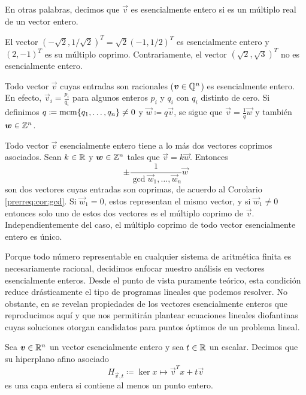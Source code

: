 \noindent
En otras palabras, decimos que $\vec{v}$ es esencialmente entero si es un múltiplo real de un vector
entero.
\begin{example}
	El vector $\left(-\sqrt{2}, 1/\sqrt{2}\right)^T = \sqrt{2}(-1, 1/2)^T$ es esencialmente entero
	y $(2, -1)^T$ es su múltiplo coprimo. Contrariamente, el vector $(\sqrt{2}, \sqrt{3})^T$ no es
	esencialmente entero.
\end{example}

\begin{observation}
	Todo vector $\vec{v}$ cuyas entradas son racionales ($\boldsymbol{v} \in \mathbb{Q}^n$) es esencialmente
	entero. En efecto, $\vec{v}_i = \frac{p_i}{q_i}$ para algunos enteros $p_i$ y $q_i$ con $q_i$
	distinto de cero. Si definimos $q \coloneq \mathop{\mathrm{mcm}{\left\lbrace q_1, \ldots, q_n \right\rbrace}} \neq 0$ y $\vec{w} \coloneq
	q\vec{v}$, se sigue que $\vec{v} = \frac{1}{q}\vec{w}$ y también $\boldsymbol{w} \in \mathbb{Z}^n$.
\end{observation}

\begin{observation}
	Todo vector $\vec{v}$ esencialmente entero tiene a lo más dos vectores coprimos asociados. Sean
	$k \in \mathbb{R}$ y $\boldsymbol{w} \in \mathbb{Z}^n$ tales que $\vec{v} = k\vec{w}$. Entonces
	\begin{equation*}
		\pm \frac{1}{\gcd{\vec{w}_1, \ldots, \vec{w}_n}}\vec{w}
	\end{equation*}
	son dos vectores cuyas entradas son coprimas, de acuerdo al Corolario \ref{prerreq:cor:gcd}. Si
	$\vec{w}_1 = 0$, estos representan el mismo vector, y si $\vec{w}_1 \neq 0$ entonces solo uno de
	estos dos vectores es el múltiplo coprimo de $\vec{v}$. Independientemente del caso, el múltiplo
	coprimo de todo vector esencialmente entero es único.
\end{observation}

Porque todo número representable en cualquier sistema de aritmética finita es necesariamente
racional, decidimos enfocar nuestro análisis en vectores esencialmente enteros. Desde el punto de
vista puramente teórico, esta condición reduce drásticamente el tipo de programas lineales que
podemos resolver. No obstante, en \cite{herr} se revelan propiedades de los vectores esencialmente
enteros que reproducimos aquí y que nos permitirán plantear ecuaciones lineales diofantinas cuyas
soluciones otorgan candidatos para puntos óptimos de un problema lineal.

\begin{definition}
	\label{phase-1:def:c-layer}
	Sea $\boldsymbol{v} \in \mathbb{R}^n$ un vector esencialmente entero y sea $t \in \mathbb{R}$ un escalar. Decimos que
	su hiperplano afino asociado
	\begin{equation}
		\label{phase-1:def:affine-hyperplane}
		H_{\vec{v}, t} \coloneq \ker{x \mapsto \vec{v}^Tx} + t\vec{v}
	\end{equation}
	es una capa entera si contiene al menos un punto entero.
\end{definition}

